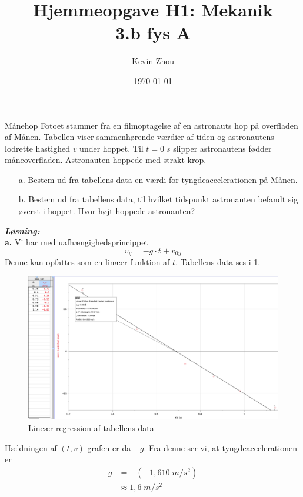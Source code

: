 \documentclass{report}
\title{Hjemmeopgave H1: Mekanik\\
{\Large \textbf{3.b fys A}}}
\author{Kevin Zhou}
\date{\today}
\newcommand{\sol}{\setlength{\parindent}{0cm}\textbf{\textit{Løsning:}}\setlength{\parindent}{1cm}}
\begin{document}
\maketitle
\begin{question}{Månehop}{}
  Fotoet stammer fra en filmoptagelse af en astronauts hop på overfladen af Månen. Tabellen viser sammenhørende værdier af tiden og astronautens lodrette hastighed $v$ under hoppet. Til $t=0 \;\unit{s} $ slipper astronautens fødder måneoverfladen. Astronauten hoppede med strakt krop.
\begin{itemize}
  \item[a.] Bestem ud fra tabellens data en værdi for tyngdeaccelerationen på Månen.
  \item[b.] Bestem ud fra tabellens data, til hvilket tidspunkt astronauten befandt sig øverst i hoppet. Hvor højt hoppede astronauten?
\end{itemize}
\end{question}
\sol \\
\textbf{a.}
Vi har med uafhængighedsprincippet
\[
v_{y}=-g \cdot t + v_{0y} 
\]
Denne kan opfattes som en linæer funktion af $t$.
Tabellens data ses i \cref{fig:astronaut}.
\begin{figure}[H]
\begin{center}
  \includegraphics[scale=0.3]{astronaut.png}
\end{center}
\caption{Lineær regression af tabellens data}
\label{fig:astronaut}
\end{figure}
Hældningen af $(t,v)$-grafen er da $-g$.
Fra denne ser vi, at tyngdeaccelerationen er 
\begin{equation*}
\begin{split}
  g&=-(-1,610 \;\unit{m/s^2} )\\ 
  &\approx 1,6 \;\unit{m/s^2} 
\end{split}
\end{equation*}
\end{document}
